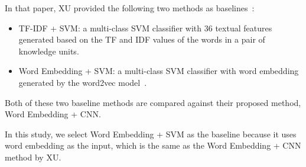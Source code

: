 \documentclass[sigconf]{acmart}
\theoremstyle{break}
\newcommand{\bi}{\begin{itemize}[leftmargin=0.4cm]}
\newcommand{\ei}{\end{itemize}}
\begin{document}



In that paper, XU provided the following two methods as baselines~\cite{xu2016predicting}:

\bi
\item TF-IDF + SVM: a multi-class SVM classifier with  36 textual features generated  based on the 
TF and IDF values of the words in a pair of knowledge units. 
\item Word Embedding + SVM:  a multi-class SVM classifier with word embedding generated by the word2vec model~\cite{mikolov2013distributed}.
\ei
Both of these two baseline methods are compared against their proposed method, Word Embedding + CNN. 

In this study, we select  Word Embedding + SVM as the baseline because it uses word embedding as the input,
which is the same as the Word Embedding + CNN method by XU.



\begin{table}[htp]
   \caption {List of Parameters Tuned by This Paper.}
\centering
{}
\label{tab:parameters}
\end{table}
\end{document}
